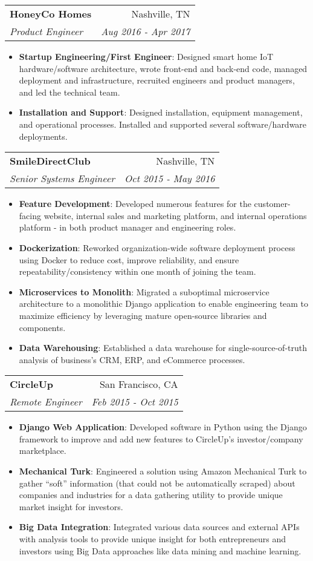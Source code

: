 \documentclass[letterpaper,10pt]{article}
\makeatletter
\newcommand{\resumeItem}[2]{
  \item\small{
    \textbf{#1}{: #2 \vspace{-2pt}}
  }
}
\newcommand{\resumeSubheading}[4]{
  \vspace{-1pt}\item
    \begin{tabular*}{0.97\textwidth}[t]{l@{\extracolsep{\fill}}r}
      \textbf{#1} & #2 \\
      \textit{\small#3} & \textit{\small #4} \\
    \end{tabular*}\vspace{-5pt}
}
\newcommand{\resumeItemListStart}{\begin{itemize}}
\newcommand{\resumeItemListEnd}{\end{itemize}\vspace{-5pt}}
\makeatother
\begin{document}
    \resumeSubheading
      {HoneyCo Homes}{Nashville, TN}
      {Product Engineer}{Aug 2016 - Apr 2017}
      \resumeItemListStart
        \resumeItem{Startup Engineering/First Engineer}
          {Designed smart home IoT hardware/software architecture, wrote front-end and back-end code, managed deployment and infrastructure, recruited engineers and product managers, and led the technical team.}
        \resumeItem{Installation and Support}
          {Designed installation, equipment management, and operational processes. Installed and supported several software/hardware deployments.}
      \resumeItemListEnd

    \resumeSubheading
      {SmileDirectClub}{Nashville, TN}
      {Senior Systems Engineer}{Oct 2015 - May 2016}
      \resumeItemListStart
        \resumeItem{Feature Development}
          {Developed numerous features for the customer-facing website, internal sales and marketing platform, and internal operations platform - in both product manager and engineering roles.}
        \resumeItem{Dockerization}
          {Reworked organization-wide software deployment process using Docker to reduce cost, improve reliability, and ensure repeatability/consistency within one month of joining the team.}
        \resumeItem{Microservices to Monolith}
          {Migrated a suboptimal microservice architecture to a monolithic Django application to enable engineering team to maximize efficiency by leveraging mature open-source libraries and components.}
       \resumeItem{Data Warehousing}
          {Established a data warehouse for single-source-of-truth analysis of business's CRM, ERP, and eCommerce processes.}
      \resumeItemListEnd
      
    \resumeSubheading
      {CircleUp}{San Francisco, CA}
      {Remote Engineer}{Feb 2015 - Oct 2015}
      \resumeItemListStart
        \resumeItem{Django Web Application}
          {Developed software in Python using the Django framework to improve and add new features to CircleUp’s investor/company marketplace.}
        \resumeItem{Mechanical Turk}
          {Engineered a solution using Amazon Mechanical Turk to gather “soft” information (that could not be automatically scraped) about companies and industries for a data gathering utility to provide unique market insight for investors.}
        \resumeItem{Big Data Integration}
          {Integrated various data sources and external APIs with analysis tools to provide unique insight for both entrepreneurs and investors using Big Data approaches like data mining and machine learning.}
      \resumeItemListEnd
\end{document}
